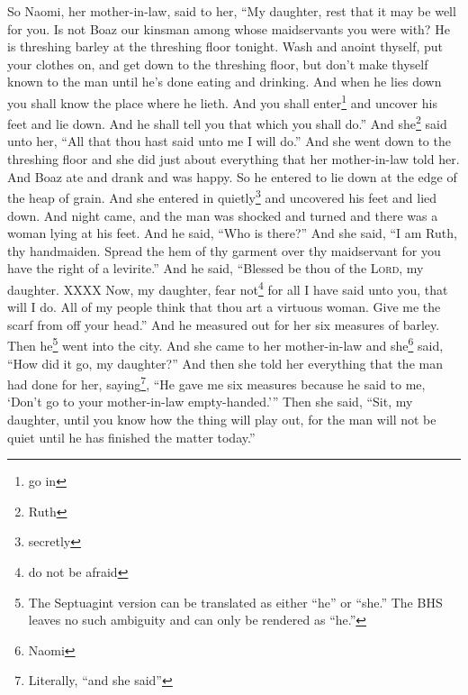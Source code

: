


\begin{enumerate*}[mode=unboxed]
     So Naomi, her mother-in-law, said to her, ``My daughter, rest that it may be well for you.%
     Is not Boaz our kinsman among whose maidservants you were with? He is threshing barley at the threshing floor tonight.%
     Wash and anoint thyself, put your clothes on, and get down to the threshing floor, but don't make thyself known to the man until he's done eating and drinking.%
     And when he lies down you shall know the place where he lieth. And you shall enter\footnote{go in} and uncover his feet and lie down. And he shall tell you that which you shall do.''%
     And she\footnote{Ruth} said unto her, ``All that thou hast said unto me I will do.''%
     And she went down to the threshing floor and she did just about everything that her mother-in-law told her.%
     And Boaz ate and drank and was happy. So he entered to lie down at the edge of the heap of grain. And she entered in quietly\footnote{secretly} and uncovered his feet and lied down.%
     And night came, and the man was shocked and turned and there was a woman lying at his feet.%
     And he said, ``Who is there?'' And she said, ``I am Ruth, thy handmaiden. Spread the hem of thy garment over thy maidservant for you have the right of a levirite.''%
     And he said, ``Blessed be thou of the \textsc{Lord}, my daughter. XXXX%
     Now, my daughter, fear not\footnote{do not be afraid} for all I have said unto you, that will I do. All of my people think that thou art a virtuous woman.%
     Give me the scarf from off your head.'' And he measured out for her six measures of barley. Then he\footnote{The Septuagint version can be translated as either ``he'' or ``she.'' The BHS leaves no such ambiguity and can only be rendered as ``he.''} went into the city.%
     And she came to her mother-in-law and she\footnote{Naomi} said, ``How did it go, my daughter?'' And then she told her everything that the man had done for her,%
     saying\footnote{Literally, ``and she said''}, ``He gave me six measures because he said to me, `Don't go to your mother-in-law empty-handed.'''%
     Then she said, ``Sit, my daughter, until you know how the thing will play out, for the man will not be quiet until he has finished the matter today.''%
\end{enumerate*}
